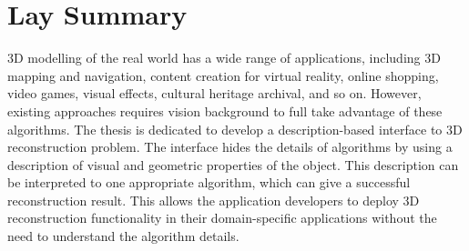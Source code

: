 
\chapter{Lay Summary}

3D modelling of the real world has a wide range of applications, including 3D mapping and navigation, content creation for virtual reality, online shopping, video games, visual effects, cultural heritage archival, and so on. However, existing approaches requires vision background to full take advantage of these algorithms. The thesis is dedicated to develop a description-based interface to 3D reconstruction problem. The interface hides the details of algorithms by using a description of visual and geometric properties of the object. This description can be interpreted to one appropriate algorithm, which can give a successful reconstruction result. This allows the application developers to deploy 3D reconstruction functionality in their domain-specific applications without the need to understand the algorithm details.